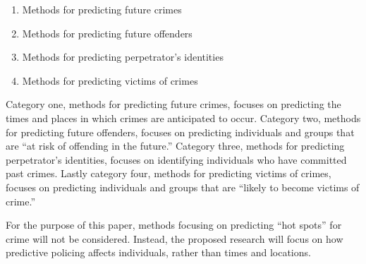 \documentclass[12pt]{article} %
\begin{document}
\begin{enumerate}
\item Methods for predicting future crimes
\item Methods for predicting future offenders
\item Methods for predicting perpetrator's identities
\item Methods for predicting victims of crimes
\end{enumerate}

Category one, methods for predicting future crimes, focuses on predicting the times and places in which crimes are anticipated to occur. Category two, methods for predicting future offenders, focuses on predicting individuals and groups that are ``at risk of offending in the future.'' Category three, methods for predicting perpetrator's identities, focuses on identifying individuals who have committed past crimes. Lastly category four, methods for predicting victims of crimes, focuses on predicting individuals and groups that are ``likely to become victims of crime.''

For the purpose of this paper, methods focusing on predicting ``hot spots'' for crime will not be considered. Instead, the proposed research will focus on how predictive policing affects individuals, rather than times and locations.















\end{document}
